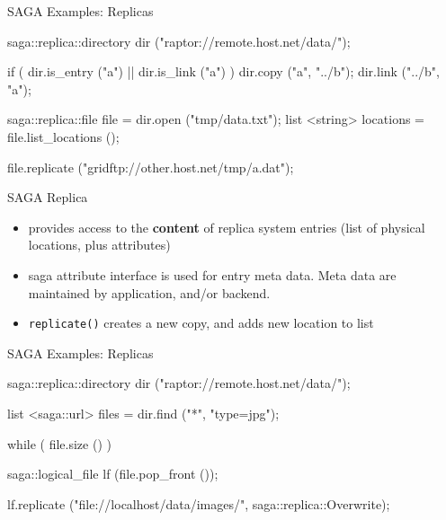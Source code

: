 \documentclass[%
  pdf,
  colorBG,
  slideColor,
  frames,
  ogf
]{prosper}
\newcommand{\T}[1]{\texttt{#1}}
\newcommand{\B}[1]{\textbf{#1}}
\newcommand{\dn}{\vspace*{+1em}}
\begin{document}
 


 \begin{slide}{SAGA Examples: Replicas}

  \begin{mycode}[label=replica management]

  saga::replica::directory dir ("raptor://remote.host.net/data/");

  if ( dir.is_entry ("a") || dir.is_link ("a") )
  {
    dir.copy ("a", "../b");
    dir.link ("../b", "a");
  }

  saga::replica::file file = dir.open ("tmp/data.txt");
  list <string>  locations = file.list_locations ();

  file.replicate ("gridftp://other.host.net/tmp/a.dat");

  \end{mycode}
   
 \end{slide}


 \begin{slide}{SAGA Replica}

  \dn\dn

  \begin{itemize}
   \item provides access to the \B{content} of replica system entries
   (list of physical locations, plus attributes)

   \item saga attribute interface is used for entry meta data.
   Meta data are maintained by application, and/or backend.

   \item \T{replicate()} creates a new copy, and adds new location to
   list


  \end{itemize}
   
 \end{slide}


 \begin{slide}{SAGA Examples: Replicas}

  \begin{mycode}[label=replica meta data]

  saga::replica::directory dir ("raptor://remote.host.net/data/");

  list <saga::url> files = dir.find ("*", "type=jpg");

  while ( file.size () )
  {
    saga::logical_file lf (file.pop_front ());

    lf.replicate ("file://localhost/data/images/", 
                  saga::replica::Overwrite);
  }

  \end{mycode}
   
 \end{slide}
\end{document}
